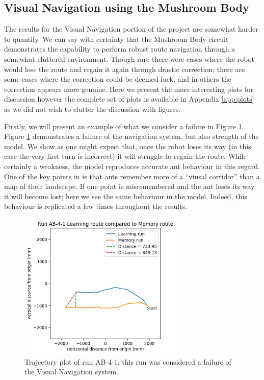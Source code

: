 \documentclass[a4paper,11pt,twoside,openright]{article}
\begin{document}
\subsection{Visual Navigation using the Mushroom Body}
The results for the Visual Navigation portion of the project are somewhat harder to quantify. We can say with certainty that the Mushroom Body circuit
demonstrates the capability to perform robust route navigation through a somewhat cluttered environment. Though rare there were cases where the robot would
lose the route and regain it again through drastic correction; there are some cases where the correction could be deemed luck, and in others the correction
appears more genuine. Here we present the more interesting plots for discussion however the complete set of plots is available in Appendix \ref{app:plots}
as we did not wish to clutter the discussion with figures. 
\newline

Firstly, we will present an example of what we consider a failure in Figure \ref{fig:ab-4-1-fail}. Figure \ref{fig:ab-4-1-fail}
demonstrates a failure of the navigation system, but also strength of the model. We show as one might expect that, once the
robot loses its way (in this case the very first turn is incorrect) it will struggle to regain the route. While certainly a
weakness, the model reproduces accurate ant behaviour in this regard. One of the key points in \cite{Wehner2006} is that
ants remember more of a ``viusal corridor'' than a map of their landscape. If one point is misremembered and the ant loses
its way it will become lost; here we see the same behaviour in the model. Indeed, this behaviour is replicated a few times
throughout the results.

\begin{figure}
 \centering
  \includegraphics[width=0.7\textwidth]{AB-4-1}
  \caption{
    \label{fig:ab-4-1-fail} Trajectory plot of run AB-4-1; this run was considered a failure of the
    Visual Navigation system.
  }
\end{figure}
\end{document}
